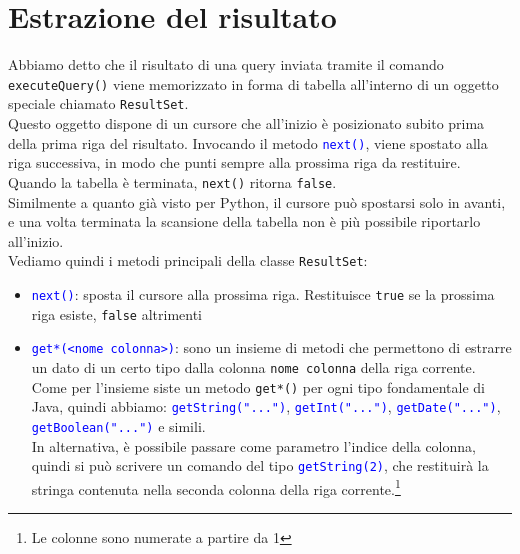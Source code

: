 \documentclass[12pt,a4paper]{book}
\begin{document}
	\section{Estrazione del risultato}
	Abbiamo detto che il risultato di una query inviata tramite il comando \texttt{executeQuery()} viene memorizzato in forma di tabella all'interno di un oggetto speciale chiamato \texttt{ResultSet}.\\Questo oggetto dispone di un cursore che all'inizio è posizionato subito prima della prima riga del risultato. Invocando il metodo \textcolor{blue}{\texttt{next()}}, viene spostato alla riga successiva, in modo che punti sempre alla prossima riga da restituire. Quando la tabella è terminata, \texttt{next()} ritorna \texttt{false}.\\Similmente a quanto già visto per Python, il cursore può spostarsi solo in avanti, e una volta terminata la scansione della tabella non è più possibile riportarlo all'inizio.\\
	Vediamo quindi i metodi principali della classe \texttt{ResultSet}:
	\begin{itemize}
		\item \textcolor{blue}{\texttt{next()}}: sposta il cursore alla prossima riga. Restituisce \texttt{true} se la prossima riga esiste, \texttt{false} altrimenti
		\item \textcolor{blue}{\texttt{get*(<nome colonna>)}}: sono un insieme di metodi che permettono di estrarre un dato di un certo tipo dalla colonna \texttt{nome colonna} della riga corrente. Come per l'insieme siste un metodo \texttt{get*()} per ogni tipo fondamentale di Java, quindi abbiamo: \textcolor{blue}{\texttt{getString("...")}}, \textcolor{blue}{\texttt{getInt("...")}}, \textcolor{blue}{\texttt{getDate("...")}}, \textcolor{blue}{\texttt{getBoolean("...")}} e simili.\\ In alternativa, è possibile passare come parametro l'indice della colonna, quindi si può scrivere un comando del tipo \textcolor{blue}{\texttt{getString(2)}}, che restituirà la stringa contenuta nella seconda colonna della riga corrente.\footnote{Le colonne sono numerate a partire da 1} 
	\end{itemize}
\end{document}
